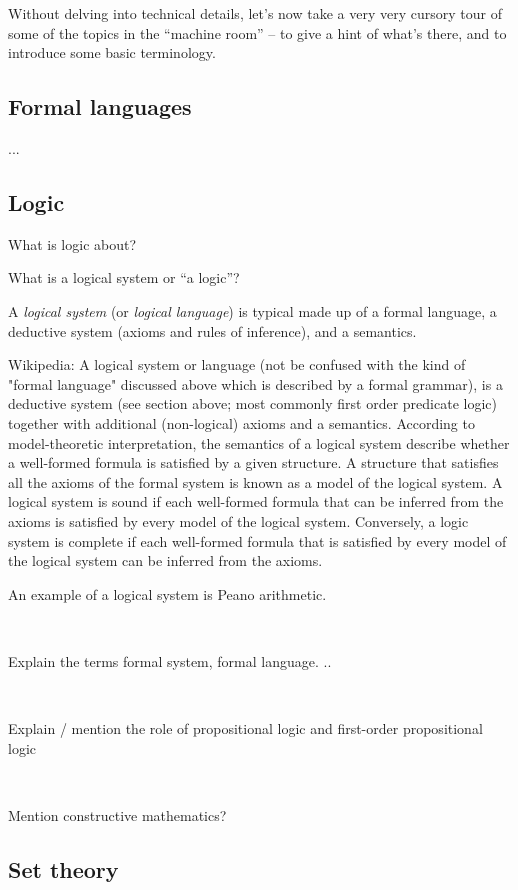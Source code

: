 Without delving into technical details, let's now take a very very cursory tour of some of the topics in the ``machine room'' -- to give a hint of what's there, and to introduce some basic terminology.

\subsection{Formal languages}

...

\subsection{Logic}

What is logic about?

What is a logical system or ``a logic''?

A \emph{logical system} (or \emph{logical language}) is typical made up of a formal language, a deductive system (axioms and rules of inference), and a semantics.

Wikipedia: A logical system or language (not be confused with the kind of "formal language" discussed above which is described by a formal grammar), is a deductive system (see section above; most commonly first order predicate logic) together with additional (non-logical) axioms and a semantics.
According to model-theoretic interpretation, the semantics of a logical system describe whether a well-formed formula is satisfied by a given structure.
A structure that satisfies all the axioms of the formal system is known as a model of the logical system.
A logical system is sound if each well-formed formula that can be inferred from the axioms is satisfied by every model of the logical system.
Conversely, a logic system is complete if each well-formed formula that is satisfied by every model of the logical system can be inferred from the axioms.

An example of a logical system is Peano arithmetic.

\

Explain the terms formal system, formal language.
..

\

Explain / mention the role of propositional logic and first-order propositional logic

\

Mention constructive mathematics?

\subsection{Set theory}

